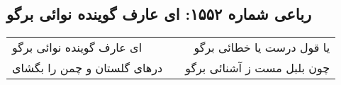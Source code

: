 \begin{center}
\section*{رباعی شماره ۱۵۵۲: ای عارف گوینده نوائی برگو}
\label{sec:1552}
\begin{longtable}{l p{0.5cm} r}
ای عارف گوینده نوائی برگو
&&
یا قول درست یا خطائی برگو
\\
درهای گلستان و چمن را بگشای
&&
چون بلبل مست ز آشنائی برگو
\\
\end{longtable}
\end{center}
